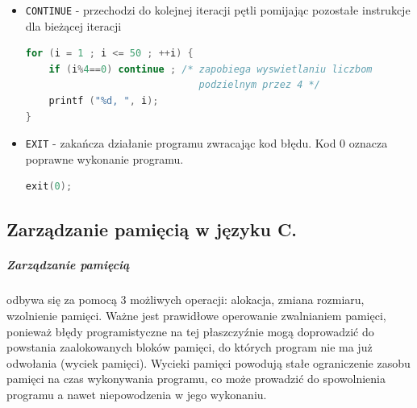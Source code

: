 \documentclass[a4paper,12pt,oneside]{book}
\begin{document}
\begin{itemize}
\begin{lstlisting}[language=C]
} 
				\end{lstlisting}
			\item \verb*|CONTINUE| - przechodzi do kolejnej iteracji pętli pomijając pozostałe instrukcje dla bieżącej iteracji
			\begin{lstlisting}[language=C]
for (i = 1 ; i <= 50 ; ++i) { 
    if (i%4==0) continue ; /* zapobiega wyswietlaniu liczbom
                              podzielnym przez 4 */
    printf ("%d, ", i); 
} 
			\end{lstlisting}
		\item \verb*|EXIT| - zakańcza działanie programu zwracając kod błędu. Kod 0 oznacza poprawne wykonanie programu.
		\begin{lstlisting}[language=C]
exit(0);
		\end{lstlisting}
				\end{itemize}
				
			\newpage\subsection{Zarządzanie pamięcią w języku C.}
				\subparagraph{Zarządzanie pamięcią} odbywa się za pomocą 3 możliwych operacji: alokacja, zmiana rozmiaru, wzolnienie pamięci. Ważne jest prawidłowe operowanie zwalnianiem pamięci, ponieważ błędy programistyczne na tej płaszczyźnie mogą doprowadzić do powstania zaalokowanych bloków pamięci, do których program nie ma już odwołania (wyciek pamięci). Wycieki pamięci powodują stałe ograniczenie zasobu pamięci na czas wykonywania programu, co może prowadzić do spowolnienia programu a nawet niepowodzenia w jego wykonaniu.\\
				
\end{document}
